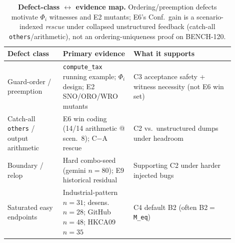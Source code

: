 \begin{table}[t]
  \centering
  \caption{\textbf{Defect-class $\leftrightarrow$ evidence map.}
    Ordering/preemption defects motivate $\Phi_i$ witnesses and E2 mutants;
    E6's Conf.\ gain is a scenario-indexed \emph{rescue} under collapsed
    unstructured feedback (catch-all \texttt{others}/arithmetic), not an
    ordering-uniqueness proof on BENCH-120.}
  \label{tab:defect-evidence-map}
  \footnotesize
  \renewcommand{\arraystretch}{1.12}
  \begin{tabular}{@{}p{0.22\linewidth}p{0.28\linewidth}p{0.40\linewidth}@{}}
    \toprule
    \textbf{Defect class} & \textbf{Primary evidence} & \textbf{What it supports} \\
    \midrule
    Guard-order / preemption
      & \texttt{compute\_tax} running example; $\Phi_i$ design;
        E2 SNO/ORO/WRO mutants
      & C3 acceptance safety + witness necessity (not E6 win set) \\
    Catch-all \texttt{others} / output arithmetic
      & E6 win coding (14/14 arithmetic @ scen.~8); C$-$A rescue
      & C2 vs.\ unstructured dumps under headroom \\
    Boundary / relop
      & Hard combo-seed (gemini $n{=}80$); E9 historical residual
      & Supporting C2 under harder injected bugs \\
    Saturated easy endpoints
      & Industrial-pattern $n{=}31$; desens.\ $n{=}28$; GitHub $n{=}48$; HKCA09 $n{=}35$
      & C4 default B2 (often B2${=}$\texttt{M\_eq}) \\
    \bottomrule
  \end{tabular}
\end{table}
